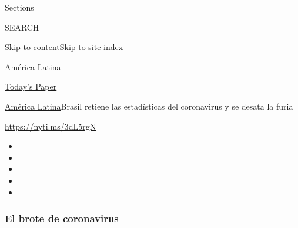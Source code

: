 Sections

SEARCH

\protect\hyperlink{site-content}{Skip to
content}\protect\hyperlink{site-index}{Skip to site index}

\href{https://www.nytimes3xbfgragh.onion/es/section/america-latina}{América
Latina}

\href{https://myaccount.nytimes3xbfgragh.onion/auth/login?response_type=cookie\&client_id=vi}{}

\href{https://www.nytimes3xbfgragh.onion/section/todayspaper}{Today's
Paper}

\href{/es/section/america-latina}{América Latina}\textbar{}Brasil
retiene las estadísticas del coronavirus y se desata la furia

\url{https://nyti.ms/3dL5rgN}

\begin{itemize}
\item
\item
\item
\item
\item
\end{itemize}

\hypertarget{el-brote-de-coronavirus}{%
\subsubsection{\texorpdfstring{\href{https://www.nytimes3xbfgragh.onion/es/spotlight/coronavirus?name=styln-coronavirus-es\&region=TOP_BANNER\&block=storyline_menu_recirc\&action=click\&pgtype=Article\&impression_id=6fc61760-f4c1-11ea-9caa-f145e0172db9\&variant=undefined}{El
brote de
coronavirus}}{El brote de coronavirus}}\label{el-brote-de-coronavirus}}

